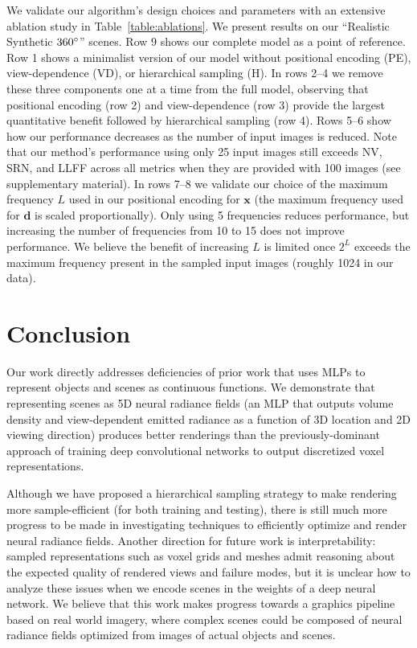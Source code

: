 \documentclass[runningheads]{llncs}
\begin{document}
We validate our algorithm's design choices and parameters with an extensive ablation study in Table~\ref{table:ablations}. We present results on our ``Realistic Synthetic $360\degree$'' scenes. Row 9 shows our complete model as a point of reference.
Row 1 shows a minimalist version of our model without positional encoding (PE), view-dependence (VD), or hierarchical sampling (H). In rows 2--4 we remove these three components one at a time from the full model, observing that positional encoding (row 2) and view-dependence (row 3) provide the largest quantitative benefit followed by hierarchical sampling (row 4).
Rows 5--6 show how our performance decreases as the number of input images is reduced. Note that our method's performance using only 25 input images still exceeds NV, SRN, and LLFF across all metrics when they are provided with 100 images (see supplementary material).
In rows 7--8 we validate our choice of the maximum frequency $L$ used in our positional encoding for $\mathbf x$ (the maximum frequency used for $\mathbf d$ is scaled proportionally). Only using 5 frequencies reduces performance, but increasing the number of frequencies from 10 to 15 does not improve performance. We believe the benefit of increasing $L$ is limited once $2^L$ exceeds the maximum frequency present in the sampled input images (roughly 1024 in our data).

\section{Conclusion}

Our work directly addresses deficiencies of prior work that uses MLPs to represent objects and scenes as continuous functions. We demonstrate that representing scenes as 5D neural radiance fields (an MLP that outputs volume density and view-dependent emitted radiance as a function of 3D location and 2D viewing direction) produces better renderings than the previously-dominant approach of training deep convolutional networks to output discretized voxel representations. 

Although we have proposed a hierarchical sampling strategy to make rendering more sample-efficient (for both training and testing), there is still much more progress to be made in investigating techniques to efficiently optimize and render neural radiance fields. Another direction for future work is interpretability: sampled representations such as voxel grids and meshes admit reasoning about the expected quality of rendered views and failure modes, but it is unclear how to analyze these issues when we encode scenes in the weights of a deep neural network. We believe that this work makes progress towards a graphics pipeline based on real world imagery, where complex scenes could be composed of neural radiance fields optimized from images of actual objects and scenes. \\
\end{document}
